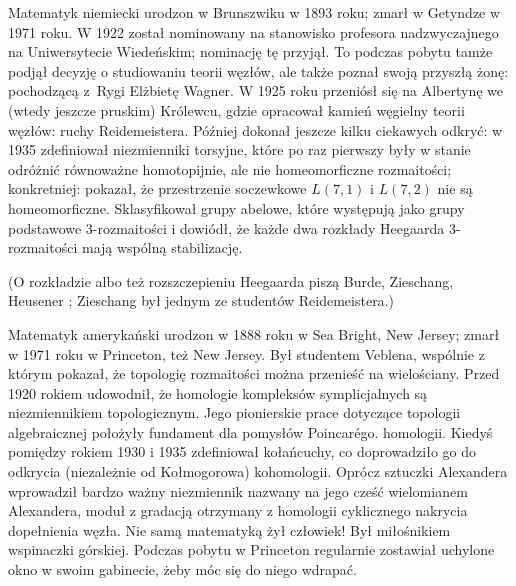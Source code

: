 \begin{remark}
    Matematyk niemiecki urodzon w Brunszwiku w 1893 roku; zmarł w Getyndze w 1971 roku.
    W 1922 został nominowany na stanowisko profesora nadzwyczajnego na Uniwersytecie Wiedeńskim; nominację tę przyjął.
    To podczas pobytu tamże podjął decyzję o studiowaniu teorii węzłów, ale także poznał swoją przyszłą żonę: pochodzącą z~Rygi Elżbietę Wagner.
    W 1925 roku przeniósł się na Albertynę we (wtedy jeszcze pruskim) Królewcu, gdzie opracował kamień węgielny teorii węzłów: ruchy Reidemeistera.
    Później dokonał jeszcze kilku ciekawych odkryć: w 1935 zdefiniował niezmienniki torsyjne, które po raz pierwszy były w stanie odróżnić równoważne homotopijnie, ale nie homeomorficzne rozmaitości; konkretniej: pokazał, że przestrzenie soczewkowe $L(7, 1)$ i $L(7, 2)$ nie są homeomorficzne.
%
%
    Sklasyfikował grupy abelowe, które występują jako grupy podstawowe 3-rozmaitości i dowiódł, że każde dwa rozkłady Heegaarda 3-rozmaitości mają wspólną stabilizację.
%
%
\end{remark}

(O rozkładzie albo też rozszczepieniu Heegaarda piszą Burde, Zieschang, Heusener \cite[s. 44]{burde2014}; Zieschang był jednym ze studentów Reidemeistera.)

\begin{remark}
    Matematyk amerykański urodzon w 1888 roku w Sea Bright, New Jersey; zmarł w 1971 roku w Princeton, też New Jersey.
    Był studentem Veblena, wspólnie z którym pokazał, że topologię rozmaitości można przenieść na wielościany.
    Przed 1920 rokiem udowodnił, że homologie kompleksów symplicjalnych są niezmiennikiem topologicznym.
    Jego pionierskie prace dotyczące topologii algebraicznej położyły fundament dla pomysłów Poincarégo.
    homologii.
    Kiedyś pomiędzy rokiem 1930 i 1935 zdefiniował kołańcuchy, co doprowadziło go do odkrycia (niezależnie od Kołmogorowa) kohomologii.
    Oprócz sztuczki Alexandera wprowadził bardzo ważny niezmiennik nazwany na jego cześć wielomianem Alexandera, moduł z gradacją otrzymany z homologii cyklicznego nakrycia dopełnienia węzła.
    Nie samą matematyką żył człowiek!
    Był miłośnikiem wspinaczki górskiej.
    Podczas pobytu w Princeton regularnie zostawiał uchylone okno w swoim gabinecie, żeby móc się do niego wdrapać.
\end{remark}

